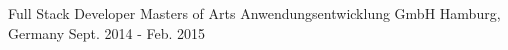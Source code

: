 \cventry
{Full Stack Developer} %
{Masters of Arts Anwendungsentwicklung GmbH} %
{Hamburg, Germany} %
{Sept. 2014 - Feb. 2015} %
{ %
}